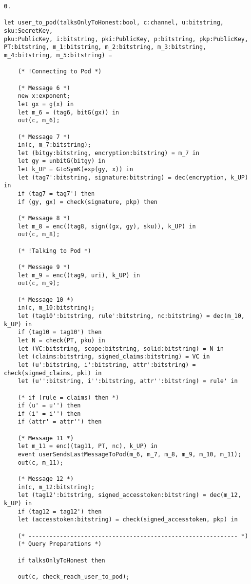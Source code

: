 \begin{Verbatim}[fontsize=\small]
    0.

let user_to_pod(talksOnlyToHonest:bool, c:channel, u:bitstring, sku:SecretKey, 
pku:PublicKey, i:bitstring, pki:PublicKey, p:bitstring, pkp:PublicKey, 
PT:bitstring, m_1:bitstring, m_2:bitstring, m_3:bitstring, m_4:bitstring, m_5:bitstring) =

    (* !Connecting to Pod *)

    (* Message 6 *)
    new x:exponent;
    let gx = g(x) in
    let m_6 = (tag6, bitG(gx)) in
    out(c, m_6);

    (* Message 7 *)
    in(c, m_7:bitstring);
    let (bitgy:bitstring, encryption:bitstring) = m_7 in
    let gy = unbitG(bitgy) in
    let k_UP = GtoSymK(exp(gy, x)) in
    let (tag7':bitstring, signature:bitstring) = dec(encryption, k_UP) in
    if (tag7 = tag7') then
    if (gy, gx) = check(signature, pkp) then

    (* Message 8 *)
    let m_8 = enc((tag8, sign((gx, gy), sku)), k_UP) in
    out(c, m_8);

    (* !Talking to Pod *)

    (* Message 9 *)
    let m_9 = enc((tag9, uri), k_UP) in
    out(c, m_9);

    (* Message 10 *)
    in(c, m_10:bitstring);
    let (tag10':bitstring, rule':bitstring, nc:bitstring) = dec(m_10, k_UP) in
    if (tag10 = tag10') then
    let N = check(PT, pku) in
    let (VC:bitstring, scope:bitstring, solid:bitstring) = N in
    let (claims:bitstring, signed_claims:bitstring) = VC in
    let (u':bitstring, i':bitstring, attr':bitstring) = check(signed_claims, pki) in
    let (u'':bitstring, i'':bitstring, attr'':bitstring) = rule' in

    (* if (rule = claims) then *)
    if (u' = u'') then
    if (i' = i'') then
    if (attr' = attr'') then

    (* Message 11 *)
    let m_11 = enc((tag11, PT, nc), k_UP) in
    event userSendsLastMessageToPod(m_6, m_7, m_8, m_9, m_10, m_11);
    out(c, m_11);

    (* Message 12 *)
    in(c, m_12:bitstring);
    let (tag12':bitstring, signed_accesstoken:bitstring) = dec(m_12, k_UP) in
    if (tag12 = tag12') then
    let (accesstoken:bitstring) = check(signed_accesstoken, pkp) in

    (* ------------------------------------------------------------ *)
    (* Query Preparations *)

    if talksOnlyToHonest then

    out(c, check_reach_user_to_pod);


\end{Verbatim}
